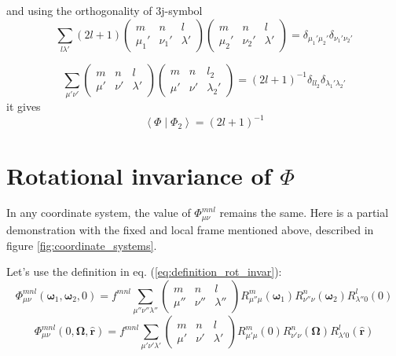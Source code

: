 and using the orthogonality of 3j-symbol \citep{Edmonds}
\begin{equation}
\sum_{l\lambda'}\left(2l+1\right)\left(\begin{array}{ccc}
m & n & l\\
\mu_{1}' & \nu_{1}' & \lambda'
\end{array}\right)\left(\begin{array}{ccc}
m & n & l\\
\mu_{2}' & \nu_{2}' & \lambda'
\end{array}\right)=\delta_{\mu_{1}'\mu_{2}'}\delta_{\nu_{1}'\nu_{2}'}
\end{equation}

\begin{equation}
\sum_{\mu'\nu'}\left(\begin{array}{ccc}
m & n & l\\
\mu' & \nu' & \lambda'
\end{array}\right)\left(\begin{array}{ccc}
m & n & l_{2}\\
\mu' & \nu' & \lambda_{2}'
\end{array}\right)=\left(2l+1\right)^{-1}\delta_{ll_{2}}\delta_{\lambda_{1}'\lambda_{2}'}
\end{equation}
it gives
\begin{equation}
\left\langle \Phi\mid\Phi_{2}\right\rangle =\left(2l+1\right)^{-1}\label{eq:2b-ortho}
\end{equation}


\section{Rotational invariance of $\Phi$}

In any coordinate system, the value of $\Phi_{\mu\nu}^{mnl}$ remains
the same. Here is a partial demonstration with the fixed and local
frame mentioned above, described in figure \ref{fig:coordinate_systems}.

Let's use the definition in eq. (\ref{eq:definition_rot_invar}):
\begin{equation}
\Phi_{\mu\nu}^{mnl}(\boldsymbol{\omega}_{1},\boldsymbol{\omega}_{2},0)=f^{mnl}\sum_{\mu''\nu''\lambda''}\left(\begin{array}{ccc}
m & n & l\\
\mu'' & \nu'' & \lambda''
\end{array}\right)R_{\mu''\mu}^{m}(\boldsymbol{\omega}_{1})R_{\nu''\nu}^{n}(\boldsymbol{\omega}_{2})R_{\lambda''0}^{l}(0)
\end{equation}
\begin{equation}
\Phi_{\mu\nu}^{mnl}(0,\mathbf{\Omega},\mathbf{\hat{r}})=f^{mnl}\sum_{\mu'\nu'\lambda'}\left(\begin{array}{ccc}
m & n & l\\
\mu' & \nu' & \lambda'
\end{array}\right)R_{\mu'\mu}^{m}(0)R_{\nu'\nu}^{n}(\mathbf{\Omega})R_{\lambda'0}^{l}(\mathbf{\hat{r}})
\end{equation}

